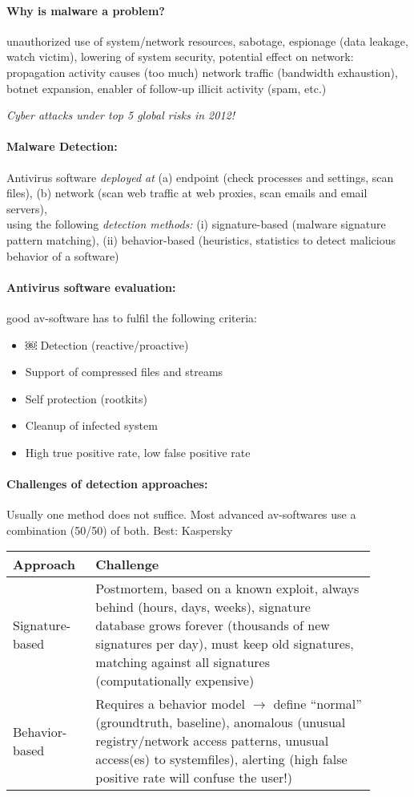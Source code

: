 \paragraph{Why is malware a problem?} unauthorized use of system/network resources,
sabotage, espionage (data leakage, watch victim),
lowering of system security, potential effect on
network: propagation activity causes (too much) network traffic (bandwidth exhaustion), botnet expansion, enabler of follow-up illicit activity (spam, etc.)

\emph{Cyber attacks under top 5 global risks in 2012!}

\paragraph{Malware Detection:} Antivirus software \emph{deployed at} (a) endpoint (check processes and settings, scan files), (b) network (scan web traffic at web proxies, scan emails and email servers), \\
using the following \emph{detection methods:} (i) signature-based (malware signature pattern matching), (ii) behavior-based (heuristics, statistics to detect malicious behavior of a software)

\paragraph{Antivirus software evaluation:} good av-software has to fulfil the following criteria:
\begin{itemize}
\item￼ Detection (reactive/proactive)
\item Support of compressed files and streams
\item Self protection (rootkits)
\item Cleanup of infected system
\item High true positive rate, low false positive rate
\end{itemize}

\paragraph{Challenges of detection approaches:} Usually one method does not suffice. Most advanced av-softwares use a combination (50/50) of both. Best: Kaspersky

\begin{tabular}{p{0.2\linewidth}p{0.7\linewidth}}
Approach & Challenge \\
\hline
\hline
Signature-based & Postmortem, based on a known exploit, always behind (hours, days, weeks), signature database grows forever (thousands of new signatures per day), must keep old signatures, matching against all signatures (computationally expensive) \\
\hline
Behavior-based & Requires a behavior model $\to$ define ``normal'' ‏(ground‏truth, ‏baseline), anomalous (unusual registry/network access patterns, unusual access(es) to systemfiles), alerting (high false positive rate will confuse the user!) \\
\end{tabular} 


